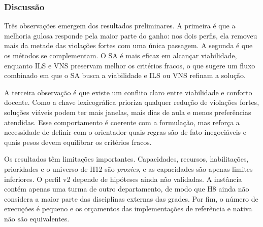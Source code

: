 \subsubsection{Discussão}

Três observações emergem dos resultados preliminares. A primeira é que a melhoria gulosa responde pela maior parte do ganho: nos dois perfis, ela removeu mais da metade das violações fortes com uma única passagem. A segunda é que os métodos se complementam. O SA é mais eficaz em alcançar viabilidade, enquanto ILS e VNS preservam melhor os critérios fracos, o que sugere um fluxo combinado em que o SA busca a viabilidade e ILS ou VNS refinam a solução.

A terceira observação é que existe um conflito claro entre viabilidade e conforto docente. Como a chave lexicográfica prioriza qualquer redução de violações fortes, soluções viáveis podem ter mais janelas, mais dias de aula e menos preferências atendidas. Esse comportamento é coerente com a formulação, mas reforça a necessidade de definir com o orientador quais regras são de fato inegociáveis e quais pesos devem equilibrar os critérios fracos.

Os resultados têm limitações importantes. Capacidades, recursos, habilitações, prioridades e o universo de H12 são \textit{proxies}, e as capacidades são apenas limites inferiores. O perfil v2 depende de hipóteses ainda não validadas. A instância contém apenas uma turma de outro departamento, de modo que H8 ainda não considera a maior parte das disciplinas externas das grades. Por fim, o número de execuções é pequeno e os orçamentos das implementações de referência e nativa não são equivalentes. 
